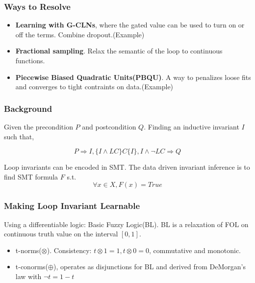 \documentclass[11pt]{beamer}
\begin{document}
\begin{frame}\frametitle{Ways to Resolve}
\begin{itemize}

\item \textbf{Learning with G-CLNs}, where the gated value can be used to turn on or off the terms. Combine dropout.(Example)

\item \textbf{Fractional sampling}. Relax the semantic of the loop to continuous functions.

\item \textbf{Piecewise Biased Quadratic Units(PBQU)}. A way to penalizes loose fits and converges to tight contraints on data.(Example)

\end{itemize}
\end{frame}
\begin{frame}\frametitle{Background}
\begin{definition}
Given the precondition $P$ and postcondition $Q$. Finding an inductive invariant $I$ such that,

\[P\Longrightarrow I, \{I\wedge LC\}C\{I\}, I\wedge \neg LC \Longrightarrow Q\]

\end{definition}
Loop invariants can be encoded in SMT. The data driven invariant inference is to find SMT formula $F$ s.t.
\[\forall x\in X, F(x) = True\]


\end{frame}

\begin{frame}\frametitle{Making Loop Invariant Learnable}
Using a differentiable logic: Basic Fuzzy Logic(BL). BL is a relaxation of FOL on continuous truth value on the interval $[0,1]$.

\begin{itemize}
\item t-norms($\otimes$). Consistency: $t \otimes 1 = 1, t \otimes 0 = 0$, commutative and monotonic.

\item t-conorms($\oplus$), operates as disjunctions for BL and derived from DeMorgan's law with $\neg t = 1 - t$ 
\end{itemize}




\end{frame}
\end{document}
